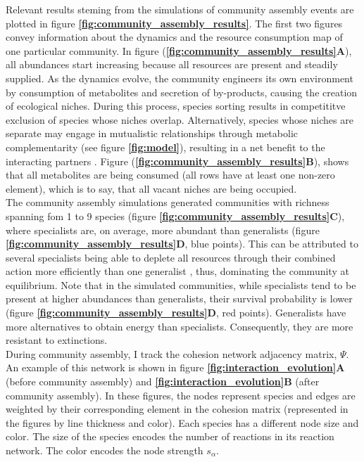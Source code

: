 \documentclass[titlepage,11pt]{article}
\begin{document}
\begin{linenumbers}
\begin{singlespace}
			Relevant results steming from the simulations of community assembly events are plotted in figure \textbf{\ref{fig:community_assembly_results}}. The first two figures convey information about the dynamics  and the resource consumption map of one particular community. In figure (\textbf{\ref{fig:community_assembly_results}A}), all abundances start increasing because all resources are present and steadily supplied. As the dynamics evolve, the community engineers its own environment by consumption of metabolites and secretion of by-products, causing the creation of ecological niches. During this process, species sorting results in competititve exclusion of species whose niches overlap. Alternatively, species whose niches are separate may engage in mutualistic relationships through metabolic complementarity (see figure \textbf{\ref{fig:model}}), resulting in a net benefit to the interacting partners \citep{Pascual-Garcia2020}. Figure (\textbf{\ref{fig:community_assembly_results}B}), shows that all metabolites are being consumed (all rows have at least one non-zero element), which is to say, that all vacant niches are being occupied.\\
			The community assembly simulations generated communities with richness spanning fom 1 to 9 species (figure \textbf{\ref{fig:community_assembly_results}C}), where specialists are, on average, more abundant than generalists (figure \textbf{\ref{fig:community_assembly_results}D}, blue points). This can be attributed to several specialists being able to deplete all resources through their combined action more efficiently than one generalist \citep{Pascual-Garcia2020}, thus, dominating the community at equilibrium. Note that in the simulated communities, while specialists tend to be present at higher abundances than generalists, their survival probability is lower (figure \textbf{\ref{fig:community_assembly_results}D}, red points). Generalists have more alternatives to obtain energy than specialists. Consequently, they are more resistant to extinctions.\\
			During community assembly, I track the cohesion network adjacency matrix, $ \Psi $. An example of this network is shown in figure \textbf{\ref{fig:interaction_evolution}A} (before community assembly) and \textbf{\ref{fig:interaction_evolution}B} (after community assembly). In these figures, the nodes represent species and edges are weighted by their corresponding element in the cohesion matrix (represented in the figures by line thickness and color). Each species has a different node size and color. The size of the species encodes the number of reactions in its reaction network. The color encodes the node strength $ s_{\alpha} $.

\end{singlespace}
\end{linenumbers}
\end{document}
